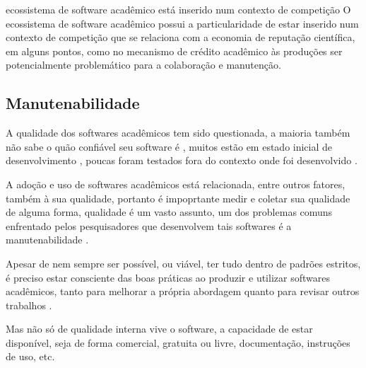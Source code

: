 ecossistema de software acadêmico está inserido num contexto de competição
O ecossistema de software acadêmico possui a particularidade de estar inserido
num contexto de competição que se relaciona com a economia de reputação
científica, em alguns pontos, como no mecanismo de crédito acadêmico às
produções ser potencialmente problemático para a colaboração e manutenção.

\subsection{Manutenabilidade}

A qualidade dos softwares acadêmicos tem sido questionada,
a maioria também não sabe o quão confiável seu software é \cite{Merali2010Computational},
muitos estão em estado inicial de desenvolvimento \cite{marshall2013tools},
poucas foram testados fora do contexto onde foi desenvolvido \cite{Portillo12}.

%

A adoção e uso de softwares acadêmicos está relacionada, entre outros fatores,
também à sua qualidade, portanto é impoprtante medir e coletar sua qualidade de
alguma forma, qualidade é um vasto assunto, um dos problemas comuns enfrentado
pelos pesquisadores que desenvolvem tais softwares é a manutenabilidade
\cite{Prlic2012}.

Apesar de nem sempre ser possível, ou viável, ter tudo dentro de padrões
estritos, é preciso estar consciente das boas práticas ao produzir e utilizar
softwares acadêmicos, tanto para melhorar a própria abordagem quanto para
revisar outros trabalhos \cite{wilson2014best}.

Mas não só de qualidade interna vive o software, a capacidade de estar disponível, seja
de forma comercial, gratuita ou livre, documentação, instruções de uso, etc.

